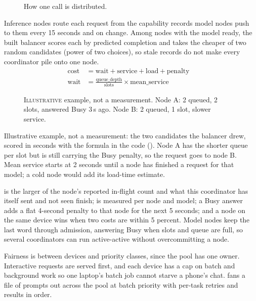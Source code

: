 \begin{figure}[htbp]
\centering
{}
\caption{How one call is distributed.}
\end{figure}

Inference nodes route each request from the capability records model nodes push to them every
15 seconds and on change. Among nodes with the model ready, the built balancer scores each by
predicted completion and takes the cheaper of two random candidates (power of two choices), so
stale records do not make every coordinator pile onto one node.
\begin{align*}
  \text{cost} &= \text{wait} + \text{service} + \text{load} + \text{penalty}\\
  \text{wait} &= \frac{\text{queue\_depth}}{\text{slots}} \times \text{mean\_service}
\end{align*}

\begin{figure}[htbp]
\centering
{}
\caption{\textsc{Illustrative} example, not a measurement. Node A: 2 queued, 2 slots, answered
Busy 3\,s ago. Node B: 2 queued, 1 slot, slower service.}
\end{figure}

Illustrative example, not a measurement: the two candidates the balancer drew, scored in seconds
with the formula in the code (). Node A has the shorter queue per slot
but is still carrying the Busy penalty, so the request goes to node B. Mean service starts at 2
seconds until a node has finished a request for that model; a cold node would add its load-time
estimate.

 is the larger of the node's reported in-flight count and what this
coordinator has itself sent and not seen finish;  is measured per node and
model; a Busy answer adds a flat 4-second penalty to that node for the next 5 seconds; and a
node on the same device wins when two costs are within 5 percent. Model nodes keep the last word
through admission, answering Busy when slots and queue are full, so several coordinators can run
active-active without overcommitting a node.

Fairness is between devices and priority classes, since the pool has one owner. Interactive
requests are served first, and each device has a cap on batch and background work so one
laptop's batch job cannot starve a phone's chat.  fans a file of prompts out
across the pool at batch priority with per-task retries and results in order.

